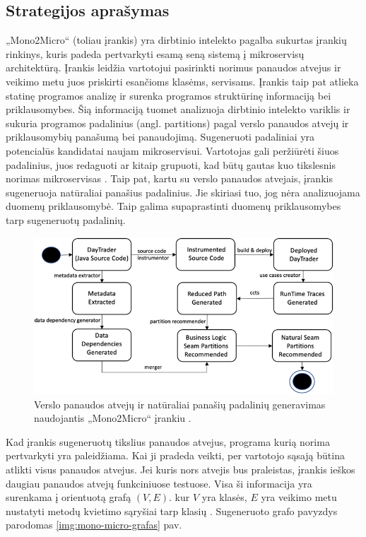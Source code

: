 \documentclass[fleqn]{VUMIFPSkursinis}
\begin{document}
\subsection{Strategijos aprašymas}
„Mono2Micro“ (toliau įrankis) yra dirbtinio intelekto pagalba sukurtas įrankių rinkinys, kuris padeda pertvarkyti esamą seną sistemą į mikroservisų architektūrą. Įrankis leidžia vartotojui pasirinkti norimus panaudos atvejus ir veikimo metu juos priskirti esančioms klasėms, servisams. Įrankis taip pat atlieka statinę programos analizę ir surenka programos struktūrinę informaciją bei priklausomybes. Šią informaciją tuomet analizuoja dirbtinio intelekto variklis ir sukuria programos padalinius (angl. partitions) pagal verslo panaudos atvejų ir priklausomybių panašumą bei panaudojimą. Sugeneruoti padaliniai yra potencialūs kandidatai naujam mikroservisui. Vartotojas gali peržiūrėti šiuos padalinius, juos redaguoti ar kitaip grupuoti, kad būtų gautas kuo tikslesnis norimas mikroservisas \cite{KXK+21}. Taip pat, kartu su verslo panaudos atvejais, įrankis sugeneruoja natūraliai panašius padalinius. Jie skiriasi tuo, jog nėra analizuojama duomenų priklausomybė. Taip galima supaprastinti duomenų priklausomybes tarp sugeneruotų padalinių.

\begin{figure}[H]
    \centering
    \includegraphics{img/mono-2-micro-veikimas.png}
    \caption{Verslo panaudos atvejų ir natūraliai panašių padalinių generavimas naudojantis „Mono2Micro“ įrankiu \cite{KXL+20}.}
    \label{img:mono-2-micro}
\end{figure}

Kad įrankis sugeneruotų tikslius panaudos atvejus, programa kurią norima pertvarkyti yra paleidžiama. Kai ji pradeda veikti, per vartotojo sąsają būtina atlikti visus panaudos atvejus. Jei kuris nors atvejis bus praleistas, įrankis ieškos daugiau panaudos atvejų funkciniuose testuose. Visa ši informacija yra surenkama į orientuotą grafą $(V, E)$. kur $V$ yra klasės, $E$ yra veikimo metu nustatyti metodų kvietimo sąryšiai tarp klasių \cite{KXL+20}. Sugeneruoto grafo pavyzdys parodomas \ref{img:mono-micro-grafas} pav.
\end{document}
